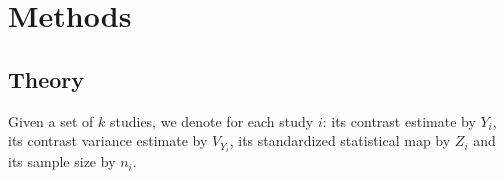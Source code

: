 \documentclass{llncs}
\newcommand{\effectvector}{Y}
\newcommand{\effect}[1][i]{\effectvector_{#1}}
\newcommand{\vareffect}[1][i]{V_{\effect[#1]}}
\newcommand{\zeffect}[1][i]{Z_{#1}}
\begin{document}




\section{Methods}
\subsection{Theory}
Given a set of $k$ studies, we denote for each study $i$: its contrast estimate by $\effect$, its contrast variance estimate by $\vareffect$, its standardized statistical map by $\zeffect$ and its sample size by $n_i$.
\end{document}
